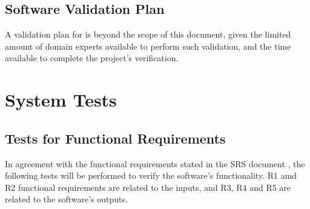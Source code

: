 \documentclass[12pt, titlepage]{article}
\begin{document}


\subsection{Software Validation Plan}

A validation plan for \progname{} is beyond the scope of this document,
given the limited amount of domain experts available to perform such validation, 
and the time available to complete the project's verification.






\section{System Tests}


\subsection{Tests for Functional Requirements}\label{func-req}

In agreement with the functional requirements stated in the SRS document \citet{SRS},
the following tests will be performed to verify the software's functionality. R1 amd R2 
functional requirements are related to the \progname{} inputs, and R3, R4 and R5 are 
related to the software's outputs.
\end{document}

